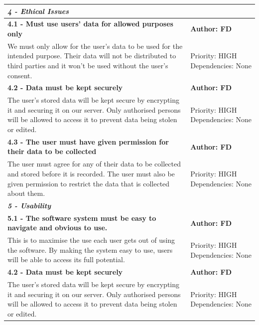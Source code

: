 \documentclass[11pt]{report}
\begin{document}
\begin{center}
\begin{longtable}{| p{13cm} | p{3cm} |}
\multicolumn{2}{|l|}{\textbf{\textit{4 - Ethical Issues}}} \\
\hline
\textbf{4.1 - Must use users’ data for allowed purposes only} & \textbf{Author: FD} \\
\hline
We must only allow for the user’s data to be used for the intended purpose. Their data will not be distributed to third parties and it won’t be used without the user’s consent.&Priority: HIGH Dependencies: None\\
\hline
\textbf{4.2 - Data must be kept securely} & \textbf{Author: FD} \\
\hline
The user’s stored data will be kept secure by encrypting it and securing it on our server. Only authorised persons will be allowed to access it to prevent data being stolen or edited.&Priority: HIGH Dependencies: None\\
\hline
\textbf{4.3 - The user must have given permission for their data to be collected} & \textbf{Author: FD} \\
\hline
The user must agree for any of their data to be collected and stored before it is recorded. The user must also be given permission to restrict the data that is collected about them.&Priority: HIGH Dependencies: None\\
\hline

\multicolumn{2}{|l|}{\textbf{\textit{5 - Usability}}} \\
\hline
\textbf{5.1 - The software system must be easy to navigate and obvious to use.} & \textbf{Author: FD} \\
\hline
This is to maximise the use each user gets out of using the software. By making  the system easy to use, users will be able to access its full potential.&Priority: HIGH Dependencies: None\\
\hline
\textbf{4.2 - Data must be kept securely} & \textbf{Author: FD} \\
\hline
The user’s stored data will be kept secure by encrypting it and securing it on our server. Only authorised persons will be allowed to access it to prevent data being stolen or edited.&Priority: HIGH Dependencies: None\\
\hline


\end{longtable}
\end{center}
\end{document}
